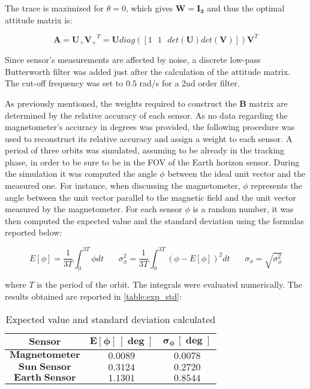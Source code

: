 The trace is maximized for $\theta=0$, which gives $\boldsymbol{W}=\boldsymbol{I_3}$ and thus the optimal attitude matrix is:

\begin{equation}
    \boldsymbol{A}=\boldsymbol{U_{+}V_{+}}^T=\boldsymbol{U}diag([1 \  \ \ 1 \ \ \ det(\boldsymbol{U})det(\boldsymbol{V})])\boldsymbol{V}^T
\end{equation}

Since sensor's measurements are affected by noise, a discrete low-pass Butterworth filter was added just after the calculation of the attitude matrix. The cut-off frequency was set to $0.5$ rad/s for a 2nd order filter.
 
As previously mentioned, the weights required to construct the $\boldsymbol{B}$ matrix are determined by the relative accuracy of each sensor. As no data regarding the magnetometer's accuracy in degrees was provided, the following procedure was used to reconstruct its relative accuracy and assign a weight to each sensor.
A period of three orbits was simulated, assuming to be already in the tracking phase, in order to be sure to be in the FOV of the Earth horizon sensor. During the simulation it was computed the angle $\phi$ between the ideal unit vector and the measured one. For instance, when discussing the magnetometer, $\phi$ represents the angle between the unit vector parallel to the magnetic field and the unit vector measured by the magnetometer. For each sensor $\phi$ is a random number, it was then computed the expected value and the standard deviation using the formulas reported below:

\begin{equation}
    E[\phi]=\frac{1}{3T}\int_{0}^{3T}\phi dt \ \ \ \  \ \ \ \ \sigma_{\phi}^2=\frac{1}{3T}\int_{0}^{3T}(\phi - E[\phi])^2 dt \ \ \ \ \ \ \ \ \sigma_{\phi}=\sqrt{\sigma_{\phi}^2}
\end{equation}

where $T$ is the period of the orbit. The integrals were evaluated numerically. The results obtained are reported in \autoref{table:exp_std}:

\begin{table}[H]

    \centering
    \begin{tabular}{|c|c|c|}
    \hline
    $\bm{Sensor}$ & $\bm{E\left[\phi\right]\, [\deg]}$ & $\bm{\sigma_{\phi} \, [\deg]}$ \\
    \hline
    $\bm{Magnetometer}$ & $0.0089$ & $0.0078$  \\
    \hline
    $\bm{Sun\;Sensor}$ & $0.3124$ & $0.2720$  \\
    \hline
    $\bm{Earth\;Sensor}$ & $1.1301$ & $0.8544$  \\
    \hline
    \end{tabular}
    
    \caption{Expected value and standard deviation calculated}
    \label{table:exp_std}
    
\end{table}

